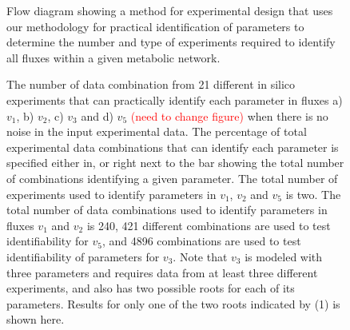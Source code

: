 \documentclass[10pt]{article}
\begin{document}
	\begin{figure}[!tbhp]
		\caption{Flow diagram showing a method for experimental design that uses our methodology for practical identification of parameters to determine the number and type of experiments required to identify all fluxes within a given metabolic network.}\label{fig:ident-design}
	\end{figure}

	\begin{figure}[!tbhp]
		\caption{The number of data combination from 21 different in silico experiments that can practically identify each parameter in fluxes a) $v_1$, b) $v_2$, c) $v_3$ and d) $v_5$ \textcolor{red}{(need to change figure)} when there is no noise in the input experimental data. The percentage of total experimental data combinations that can identify each parameter is specified either in, or right next to the bar showing the total number of combinations identifying a given parameter. The total number of experiments used to identify parameters in $v_1$, $v_2$ and $v_5$ is two. The total number of data combinations used to identify parameters in fluxes $v_1$ and $v_2$ is 240, 421 different combinations are used to test identifiability for $v_5$, and 4896 combinations are used to test identifiability of parameters for $v_3$. Note that $v_3$ is modeled with three parameters and requires data from at least three different experiments, and also has two possible roots for each of its parameters. Results for only one of the two roots indicated by (1) is shown here.}\label{fig:ident}
	\end{figure}
\end{document}
